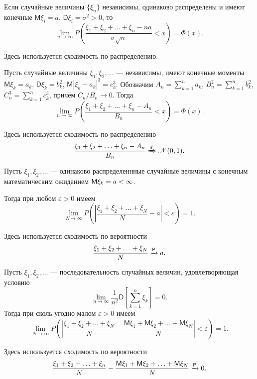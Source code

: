 \begin{theorem}
	Если случайные величины $ \{\xi_n\} $ независимы, одинаково распределены и
	имеют конечные $ \mathsf M\xi_i = a $, $ \mathsf D\xi_i = \sigma^2 > 0 $, то 
	\[
		\lim_{n\to\infty} P \left( \frac{\xi_1 + \xi_2 + \ldots + \xi_n -
		na}{\sigma \sqrt n} < x \right)  = \Phi(x).
	\]
	
	Здесь используется сходимость по распределению.
\end{theorem}
\begin{theorem}[Ляпунов]
Пусть случайные величины $ \xi_1, \xi_2, \ldots $ --- независимы, имеют конечные
моменты $ \mathsf M \xi_k = a_k $, $ \mathsf D\xi_k = b^2_k $, $ \mathsf
M|\xi_k-a_k|^3 = c^3_k $. Обозначим $ A_n = \sum^n_{k=1} a_k $, $ B^2_n =
\sum^n_{k=1} b^2_k $, $ C^3_n = \sum^n_{k=1}c^3_k $, причём $ C_n/B_n \to 0 $.
Тогда 
\[
	\lim_{n\to\infty} P \left( \frac{\xi_1+\xi_2+\ldots+\xi_n-A_n}{B_n} < x
		\right) = \Phi(x).
\]

Здесь используется сходимость по распределению 
\[
		\frac{\xi_1+\xi_2+\ldots+\xi_n-A_n}{B_n} \xRightarrow[]{d} \mathscr N(0,1).
\]
\end{theorem}
\begin{theorem}[Хинчин] 
	Пусть $ \xi_1,\xi_2,\ldots $ --- одинаково распределеннные случайные величины
	с конечным математическим ожиданием $ \mathsf M \xi_k = a < \infty$.

	Тогда при любом $ \varepsilon > 0 $ имеем  
	\[
		\lim_{N\to\infty} P \left( \left| \frac{\xi_1+\xi_2+\ldots+\xi_N}{N} - a
		\right| < \varepsilon \right)  = 1.
	\]
	
	Здесь используется сходимость по вероятности  
	\[
			\frac{\xi_1+\xi_2+\ldots+\xi_N}{N} \xrightarrow[]{\mathsf P} a.
	\]
\end{theorem}
\begin{theorem}[Марков]
	Пусть $ \xi_1,\xi_2,\ldots $ --- последовательность случайных величин,
	удовлетворяющая условию  
	\[
		\lim_{n\to\infty} \frac{1}{n^2} \mathsf D [\sum_{k=1}^n \xi_k] = 0.
	\]
	Тогда при сколь угодно малом $ \varepsilon > 0 $ имеем 
	\[
		\lim_{N\to\infty} P \left( \left| \frac{\xi_1 + \xi_2 + \ldots + \xi_N}{N} -
		\frac{\mathsf M \xi_1 + \mathsf M\xi_2 + \ldots + \mathsf M \xi_N}{N}\right|
	< \varepsilon \right) = 1.
	\]

Здесь используется сходимость по вероятности  
\[
		\frac{\xi_1 + \xi_2 + \ldots + \xi_n}{N} - \frac{\mathsf M\xi_1 + \mathsf
		M\xi_2 + \ldots + \mathsf M\xi_N}{N} \xrightarrow[]{\mathsf P} 0.
\]	
\end{theorem}

